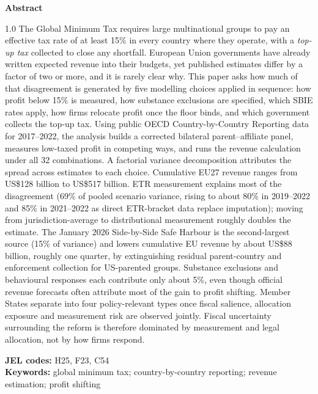 \documentclass[11pt,a4paper]{article}
\begin{document}
\begin{titlepage}
  \vspace{0.25em}
  \begin{center}
    {\small\bfseries Abstract}
  \end{center}
  \vspace{-0.15em}
  \noindent\small
  \begin{spacing}{1.0}
  The Global Minimum Tax requires large multinational groups to pay an effective tax rate of at least 15\% in every country where they operate, with a \emph{top-up tax} collected to close any shortfall. European Union governments have already written expected revenue into their budgets, yet published estimates differ by a factor of two or more, and it is rarely clear why. This paper asks how much of that disagreement is generated by five modelling choices applied in sequence: how profit below 15\% is measured, how substance exclusions are specified, which SBIE rates apply, how firms relocate profit once the floor binds, and which government collects the top-up tax. Using public OECD Country-by-Country Reporting data for 2017--2022, the analysis builds a corrected bilateral parent--affiliate panel, measures low-taxed profit in competing ways, and runs the revenue calculation under all 32 combinations. A factorial variance decomposition attributes the spread across estimates to each choice. Cumulative EU27 revenue ranges from US\$128 billion to US\$517 billion. ETR measurement explains most of the disagreement (69\% of pooled scenario variance, rising to about 80\% in 2019--2022 and 85\% in 2021--2022 as direct ETR-bracket data replace imputation); moving from jurisdiction-average to distributional measurement roughly doubles the estimate. The January 2026 Side-by-Side Safe Harbour is the second-largest source (15\% of variance) and lowers cumulative EU revenue by about US\$88 billion, roughly one quarter, by extinguishing residual parent-country and enforcement collection for US-parented groups. Substance exclusions and behavioural responses each contribute only about 5\%, even though official revenue forecasts often attribute most of the gain to profit shifting. Member States separate into four policy-relevant types once fiscal salience, allocation exposure and measurement risk are observed jointly. Fiscal uncertainty surrounding the reform is therefore dominated by measurement and legal allocation, not by how firms respond.
  \end{spacing}

  \vspace{0.35em}
  \noindent\small
  \textbf{JEL codes:} H25, F23, C54\\[0.15em]
  \textbf{Keywords:} global minimum tax; country-by-country reporting; revenue estimation; profit shifting
  \restoregeometry
\end{titlepage}
\hypersetup{pageanchor=true}
\end{document}

